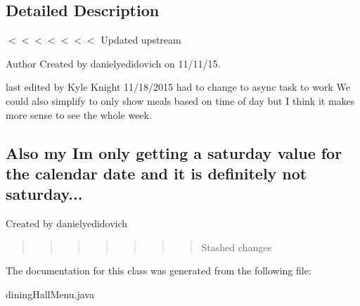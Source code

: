 \subsection{Detailed Description}
$<$$<$$<$$<$$<$$<$$<$ Updated upstream \begin{DoxyAuthor}{Author}
Created by danielyedidovich on 11/11/15. 

last edited by Kyle Knight 11/18/2015 had to change to async task to work We could also simplify to only show meals based on time of day but I think it makes more sense to see the whole week. \subsection*{Also my I\textquotesingle{}m only getting a saturday value for the calendar date and it is definitely not saturday... }

Created by danielyedidovich \begin{quote}
\begin{quote}
\begin{quote}
\begin{quote}
\begin{quote}
\begin{quote}
\begin{quote}
Stashed changes\end{quote}
\end{quote}
\end{quote}
\end{quote}
\end{quote}
\end{quote}
\end{quote}

\end{DoxyAuthor}


The documentation for this class was generated from the following file\+:\begin{DoxyCompactItemize}
\item 
dining\+Hall\+Menu.\+java\end{DoxyCompactItemize}
